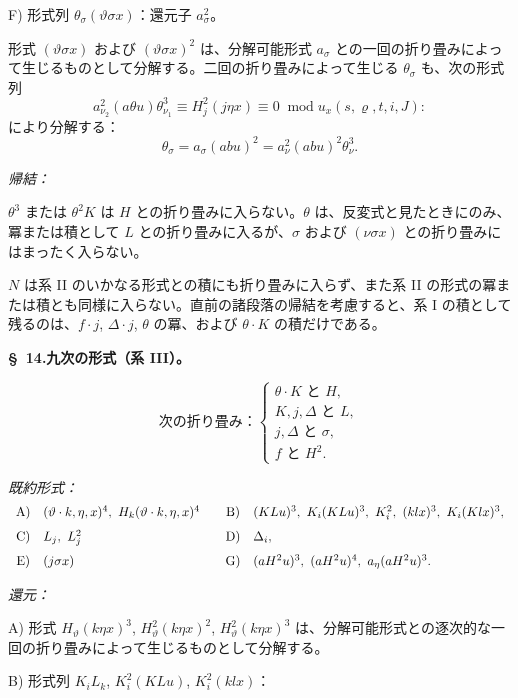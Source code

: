 \documentclass[11pt]{article}
\newcommand{\A}{\Delta}
\newcommand{\R}{\varrho}
\newcommand{\modu}[1]{\;\operatorname{mod} #1}
\begin{document}
\noindent F) 形式列 $\theta_\sigma(\vartheta\sigma x)$：還元子 $a_\sigma^2$。

形式 $(\vartheta\sigma x)$ および $(\vartheta\sigma x)^2$ は、分解可能形式 $a_\sigma$ との一回の折り畳みによって生じるものとして分解する。二回の折り畳みによって生じる $\theta_\sigma$ も、次の形式列
\[
a_{\nu_2}^2(a\theta u)\theta_{\nu_1}^3\equiv H_j^2(j\eta x)\equiv0\modu{u_x(s,\R,t,i,J)}:
\]
により分解する：
\[
\theta_\sigma=a_\sigma(abu)^2=a_\nu^2(abu)^2\theta_\nu^3.
\]

\noindent\emph{帰結：}

$\theta^3$ または $\theta^2K$ は $H$ との折り畳みに入らない。$\theta$ は、反変式と見たときにのみ、冪または積として $L$ との折り畳みに入るが、$\sigma$ および $(\nu\sigma x)$ との折り畳みにはまったく入らない。

$N$ は系 II のいかなる形式との積にも折り畳みに入らず、また系 II の形式の冪または積とも同様に入らない。直前の諸段落の帰結を考慮すると、系 I の積として残るのは、$f\cdot j$, $\A\cdot j$, $\theta$ の冪、および $\theta\cdot K$ の積だけである。

\begin{center}
\textbf{\S\ 14.\quad 九次の形式（系 III）。}
\end{center}
\[
\text{次の折り畳み：}\left\{\begin{array}{l}
\theta\cdot K\text{ と }H,\\
K,j,\A\text{ と }L,\\
j,\A\text{ と }\sigma,\\
f\text{ と }H^2.
\end{array}\right.
\]

\noindent\emph{既約形式：}
\[
\begin{array}{c@{\quad}l@{\qquad}c@{\quad}l}
\text{A)}&(\vartheta\cdot k,\eta,x)^4,
\ H_k(\vartheta\cdot k,\eta,x)^4&
\text{B)}&(KLu)^3,
\ K_i(KLu)^3,
\ K_i^2,
\ (klx)^3,
\ K_i(Klx)^3,\\[0.7em]
\text{C)}&L_j,
\ L_j^2&
\text{D)}&\A_i,\\[0.7em]
\text{E)}&(j\sigma x)&
\text{G)}&(aH^2u)^3,
\ (aH^2u)^4,
\ a_\eta(aH^2u)^3.
\end{array}
\]

\noindent\emph{還元：}

A) 形式 $H_\vartheta(k\eta x)^3$, $H_\vartheta^2(k\eta x)^2$, $H_\vartheta^2(k\eta x)^3$ は、分解可能形式との逐次的な一回の折り畳みによって生じるものとして分解する。

B) 形式列 $K_iL_k$, $K_i^2(KLu)$, $K_i^2(klx)$：
\end{document}
